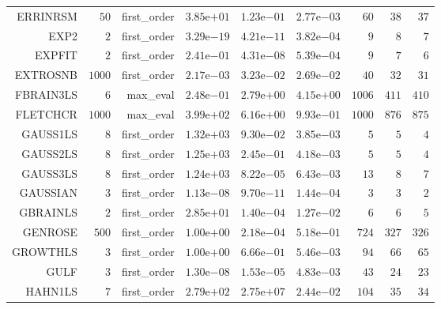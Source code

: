\begin{longtable}{rrrrrrrrr}
ERRINRSM & \(    50\) & first\_order & \( 3.85\)e\(+01\) & \( 1.23\)e\(-01\) & \( 2.77\)e\(-03\) & \(    60\) & \(    38\) & \(    37\) \\
EXP2 & \(     2\) & first\_order & \( 3.29\)e\(-19\) & \( 4.21\)e\(-11\) & \( 3.82\)e\(-04\) & \(     9\) & \(     8\) & \(     7\) \\
EXPFIT & \(     2\) & first\_order & \( 2.41\)e\(-01\) & \( 4.31\)e\(-08\) & \( 5.39\)e\(-04\) & \(     9\) & \(     7\) & \(     6\) \\
EXTROSNB & \(  1000\) & first\_order & \( 2.17\)e\(-03\) & \( 3.23\)e\(-02\) & \( 2.69\)e\(-02\) & \(    40\) & \(    32\) & \(    31\) \\
FBRAIN3LS & \(     6\) & max\_eval & \( 2.48\)e\(-01\) & \( 2.79\)e\(+00\) & \( 4.15\)e\(+00\) & \(  1006\) & \(   411\) & \(   410\) \\
FLETCHCR & \(  1000\) & max\_eval & \( 3.99\)e\(+02\) & \( 6.16\)e\(+00\) & \( 9.93\)e\(-01\) & \(  1000\) & \(   876\) & \(   875\) \\
GAUSS1LS & \(     8\) & first\_order & \( 1.32\)e\(+03\) & \( 9.30\)e\(-02\) & \( 3.85\)e\(-03\) & \(     5\) & \(     5\) & \(     4\) \\
GAUSS2LS & \(     8\) & first\_order & \( 1.25\)e\(+03\) & \( 2.45\)e\(-01\) & \( 4.18\)e\(-03\) & \(     5\) & \(     5\) & \(     4\) \\
GAUSS3LS & \(     8\) & first\_order & \( 1.24\)e\(+03\) & \( 8.22\)e\(-05\) & \( 6.43\)e\(-03\) & \(    13\) & \(     8\) & \(     7\) \\
GAUSSIAN & \(     3\) & first\_order & \( 1.13\)e\(-08\) & \( 9.70\)e\(-11\) & \( 1.44\)e\(-04\) & \(     3\) & \(     3\) & \(     2\) \\
GBRAINLS & \(     2\) & first\_order & \( 2.85\)e\(+01\) & \( 1.40\)e\(-04\) & \( 1.27\)e\(-02\) & \(     6\) & \(     6\) & \(     5\) \\
GENROSE & \(   500\) & first\_order & \( 1.00\)e\(+00\) & \( 2.18\)e\(-04\) & \( 5.18\)e\(-01\) & \(   724\) & \(   327\) & \(   326\) \\
GROWTHLS & \(     3\) & first\_order & \( 1.00\)e\(+00\) & \( 6.66\)e\(-01\) & \( 5.46\)e\(-03\) & \(    94\) & \(    66\) & \(    65\) \\
GULF & \(     3\) & first\_order & \( 1.30\)e\(-08\) & \( 1.53\)e\(-05\) & \( 4.83\)e\(-03\) & \(    43\) & \(    24\) & \(    23\) \\
HAHN1LS & \(     7\) & first\_order & \( 2.79\)e\(+02\) & \( 2.75\)e\(+07\) & \( 2.44\)e\(-02\) & \(   104\) & \(    35\) & \(    34\) \\

\end{longtable}
